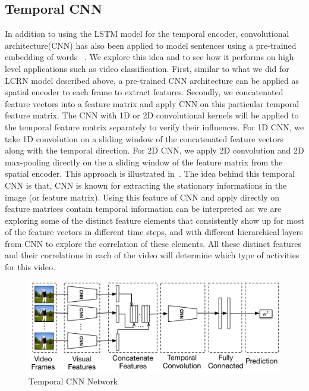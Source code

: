 
\subsection{Temporal CNN}
In addition to using the LSTM model for the temporal encoder, convolutional architecture(CNN) has also been applied to model sentences using a pre-trained embedding of words ~\cite{cnnSC,cnnMNLS}. We explore this idea and to see how it performs on high level applications such as video classification. First, similar to what we did for LCRN model described above, a pre-trained CNN architecture can be applied as spatial encoder to each frame to extract features. 
Secondly, we concatenated feature vectors into a feature matrix and apply CNN on this particular temporal feature matrix. The CNN with 1D or 2D convolutional kernels will be applied to the temporal feature matrix separately to verify their influences. For 1D CNN, we take 1D convolution on a sliding window of the concatenated feature vectors along with the temporal direction. For 2D CNN, we apply 2D convolution and 2D max-pooling directly on the a sliding window of the feature matrix from the spatial encoder. This approach is illustrated in~.
The idea behind this temporal CNN is that, CNN is known for extracting the stationary informations in the image (or feature matrix). Using this feature of CNN and apply directly on feature matrices contain temporal information can be interpreted as: we are exploring some of the distinct feature elements that consistently show up for most of the feature vectors in different time steps, and with different hierarchical layers from CNN to explore the correlation of these elements. All these distinct features and their correlations in each of the video will determine which type of activities for this video. 

\begin{figure}
  \centering
  \includegraphics[width=1.0\linewidth]{figs/tnn}
  \caption{Temporal CNN Network}
  \label{fig:tnn}
\end{figure}

